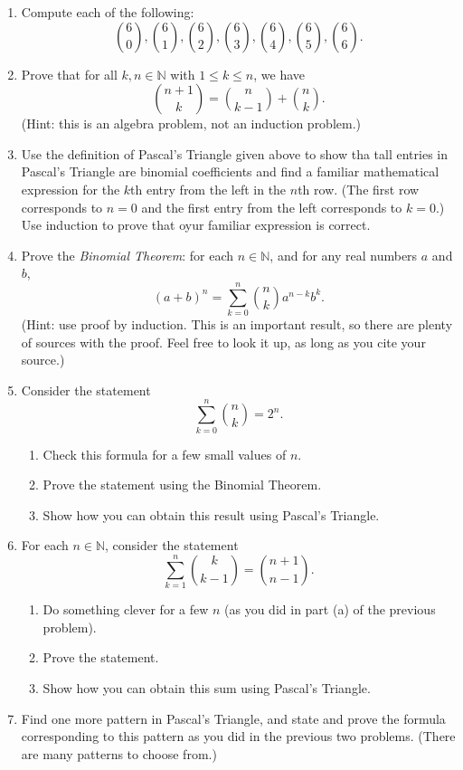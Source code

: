 \documentclass[letterpaper,12pt]{article}
\theoremstyle{definition}
\begin{document}
\begin{enumerate}
 \item Compute each of the following:
\[
 \binom{6}{0}, \binom{6}{1}, \binom{6}{2}, \binom{6}{3}, \binom{6}{4}, \binom{6}{5}, \binom{6}{6}.
\]
 \item Prove that for all $k,n\in\mathbb{N}$ with $1\leq k\leq n$, we have
\[
 \binom{n+1}{k} = \binom{n}{k-1}+\binom{n}{k}.
\]
(Hint: this is an algebra problem, not an induction problem.)
 \item Use the definition of Pascal's Triangle given above to show tha tall entries in Pascal's Triangle are binomial coefficients and find a familiar mathematical expression for the $k$th entry from the left in the $n$th row. (The first row corresponds to $n=0$ and the first entry from the left corresponds to $k=0$.) Use induction to prove that oyur familiar expression is correct.
 \item Prove the {\em Binomial Theorem}: for each $n\in\mathbb{N}$, and for any real numbers $a$ and $b$,
\[
 (a+b)^n = \sum_{k=0}^n\binom{n}{k}a^{n-k}b^k.
\]
 (Hint: use proof by induction. This is an important result, so there are plenty of sources with the proof. Feel free to look it up, as long as you cite your source.)
 \item Consider the statement
\[
 \sum_{k=0}^n\binom{n}{k} = 2^n.
\]
\begin{enumerate}
 \item Check this formula for a few small values of $n$.
 \item Prove the statement using the Binomial Theorem.
 \item Show how you can obtain this result using Pascal's Triangle.
\end{enumerate}
 \item For each $n\in\mathbb{N}$, consider the statement
\[
 \sum_{k=1}^n\binom{k}{k-1} = \binom{n+1}{n-1}.
\]
\begin{enumerate}
 \item Do something clever for a few $n$ (as you did in part (a) of the previous problem).
 \item Prove the statement.
 \item Show how you can obtain this sum using Pascal's Triangle.
\end{enumerate}
 \item Find one more pattern in Pascal's Triangle, and state and prove the formula corresponding to this pattern as you did in the previous two problems. (There are many patterns to choose from.)
\end{enumerate}
\end{document}
